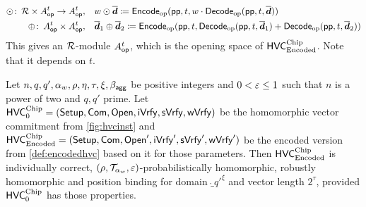 \begin{align*}
 \odot\colon\,\mathcal{R}\times A_{\mathsf{op}}^{t}\to A_{\mathsf{op}}^{t},&\quad w\odot \overline{\boldsymbol{d}} \coloneqq \mathsf{Encode}_{\mathrm{op}}(\mathsf{pp},t, w\cdot\mathsf{Decode}_{\mathrm{op}}(\mathsf{pp}, t, \overline{\boldsymbol{d}}))\\
 \oplus\colon\,A_{\mathsf{op}}^{t}\times A_{\mathsf{op}}^{t},&\quad \overline{\boldsymbol{d}}_1 \oplus \overline{\boldsymbol{d}}_2 \coloneqq \mathsf{Encode}_{\mathrm{op}}(\mathsf{pp}, t, \mathsf{Decode}_{\mathrm{op}}(\mathsf{pp},t,\overline{\boldsymbol{d}}_1) + \mathsf{Decode}_{\mathrm{op}}(\mathsf{pp}, t,\overline{\boldsymbol{d}}_2))
\end{align*}
This gives an $\mathcal{R}$-module $A_{\mathsf{op}}^{t}$, which is the opening space of $\mathsf{HVC}_{\textup{Encoded}}^{\textup{Chip}}$.
Note that it depends on $t$.

\begin{theorem}\label{thm:encodedhvcworks}
Let $n, q, q',\alpha_w,\rho, \eta, \tau, \xi, \beta_{\mathsf{agg}}$ be positive integers and $0<\varepsilon \leq 1$ such that $n$ is a power of two and $q,q'$ prime.
Let $\mathsf{HVC}^{\textup{Chip}}_{0} = (\mathsf{Setup},\mathsf{Com},\mathsf{Open},\mathsf{iVrfy},\mathsf{sVrfy}, \mathsf{wVrfy})$ be the homomorphic vector commitment from \autoref{fig:hvcinst} and $\mathsf{HVC}_{\textup{Encoded}}^{\textup{Chip}} = (\mathsf{Setup},\mathsf{Com},\mathsf{Open}',\mathsf{iVrfy}',\mathsf{sVrfy}', \mathsf{wVrfy}')$ be the encoded version from \autoref{def:encodedhvc} based on it for those parameters.
Then $\mathsf{HVC}_{\textup{Encoded}}^{\textup{Chip}}$ is individually correct, $(\rho,\mathcal{T}_{\alpha_w},\varepsilon)$-probabilistically homomorphic, robustly homomorphic and position binding for domain $\ring_{q'}^\xi$ and vector length $2^\tau$, provided $\mathsf{HVC}^{\textup{Chip}}_{0}$ has those properties.
\end{theorem}
